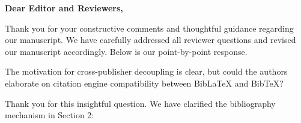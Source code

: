 \documentclass{../../packages/custom/response}
\begin{document}
\makeresponsetitle

\noindent\textbf{Dear Editor and Reviewers,}

Thank you for your constructive comments and thoughtful guidance regarding our manuscript. We have carefully addressed all reviewer questions and revised our manuscript accordingly. Below is our point-by-point response.

\vspace{1em}
\makeresponsetoc
\vspace{1.5em}

\reviewer

\begin{reviewercomment}
The motivation for cross-publisher decoupling is clear, but could the authors elaborate on citation engine compatibility between BibLaTeX and BibTeX?
\end{reviewercomment}

\begin{authorresponse}
Thank you for this insightful question. We have clarified the bibliography mechanism in Section 2:

\begin{revisedtext}
\end{revisedtext}
\end{authorresponse}
\end{document}
